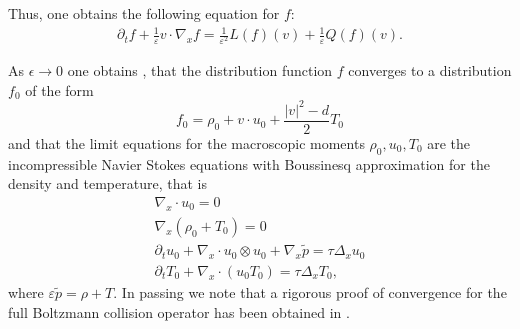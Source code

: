 \documentclass[final,11pt]{siamart251216}
\numberwithin{equation}{section}
\theoremstyle{definition}
\theoremstyle{remark}
\begin{document}
Thus, one obtains the following equation for $f$:
\begin{align}
\partial_t f + \frac{1}{\varepsilon} v \cdot \nabla_x f = \frac{1}{\varepsilon^2} L(f)(v) + \frac{1}{\varepsilon} Q(f)(v). \label{eq:expansion}
\end{align}

As $\epsilon \rightarrow 0$ one obtains  \cite{SR,Levermore91}, that the distribution function $f$ converges to a distribution $f_0$ of the form 
\[
f_0 = \rho_0 + v \cdot u_0 + \frac{|v|^2 - d}{2} T_0
\]
and that the limit equations for the macroscopic moments $\rho_0,u_0,T_0$ are the
incompressible Navier Stokes equations with Boussinesq approximation for the density and temperature, that is
\begin{align}
	\label{limit0}
	\nabla_x \cdot  u_0 =0 \\
	\nabla_x (\rho_0+T_0) =0 \nonumber\\
	\partial_t u _0+ \nabla_x \cdot u _0 \otimes u_0 + \nabla_x \tilde{p}= \tau  \Delta_x  u_0\nonumber\\
	\partial_t T _0+\nabla_x \cdot (u_0T_0) =  \tau \Delta_x T_0,\nonumber
\end{align}
where $\varepsilon\tilde{p} = \rho +T$.
In passing we note that a rigorous proof of convergence for the full Boltzmann collision operator has been obtained in \cite{GSR}.
\end{document}
